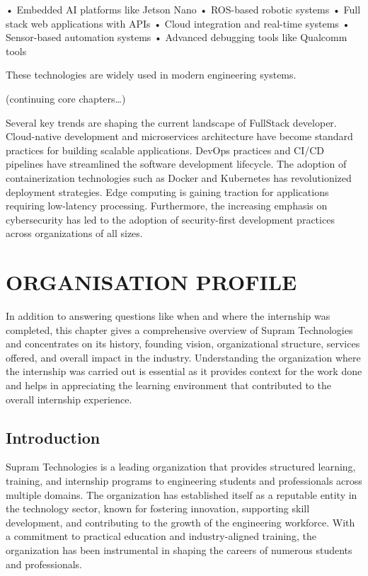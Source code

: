 \documentclass[12pt,a4paper]{report}
\begin{document}
• Embedded AI platforms like Jetson Nano • ROS-based robotic systems • Full stack web applications with APIs • Cloud integration and real-time systems • Sensor-based automation systems • Advanced debugging tools like Qualcomm tools


These technologies are widely used in modern engineering systems.


(continuing core chapters…)


Several key trends are shaping the current landscape of FullStack developer. Cloud-native development and microservices architecture have become standard practices for building scalable applications. DevOps practices and CI/CD pipelines have streamlined the software development lifecycle. The adoption of containerization technologies such as Docker and Kubernetes has revolutionized deployment strategies. Edge computing is gaining traction for applications requiring low-latency processing. Furthermore, the increasing emphasis on cybersecurity has led to the adoption of security-first development practices across organizations of all sizes.




\chapter{ORGANISATION PROFILE}
\label{ch:org}


In addition to answering questions like when and where the internship was completed, this chapter gives a comprehensive overview of Supram Technologies and concentrates on its history, founding vision, organizational structure, services offered, and overall impact in the industry. Understanding the organization where the internship was carried out is essential as it provides context for the work done and helps in appreciating the learning environment that contributed to the overall internship experience.


\section{Introduction}

Supram Technologies is a leading organization that provides structured learning, training, and internship programs to engineering students and professionals across multiple domains. The organization has established itself as a reputable entity in the technology sector, known for fostering innovation, supporting skill development, and contributing to the growth of the engineering workforce. With a commitment to practical education and industry-aligned training, the organization has been instrumental in shaping the careers of numerous students and professionals.
\end{document}
